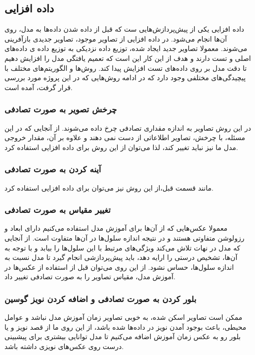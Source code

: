 \subsection{داده افزایی}\label{subsec:داده-افزایی}

داده افزایی یکی از پیش‌پردازش‌هایی ست که قبل از داده شدن داده‌ها به مدل، روی آن‌ها انجام می‌شود.
در داده افزایی از تصاویر موجود، تصاویر جدیدی بازآفرینی می‌شوند.
معمولا تصاویر جدید ایجاد شده، توزیع داده نزدیکی به توزیع داده ی داده‌های اصلی و تست دارند و هدف از این کار این است که تعمیم یافتگی مدل را افزایش دهیم تا دقت مدل بر روی داده‌های تست افزایش پیدا کند.
روش‌ها و الگوریتم‌های مختلف با پیچیدگی‌های مختلفی وجود دارد که در ادامه روش‌هایی که در این پروژه مورد بررسی قرار گرفت، آمده است.
\subsubsection{چرخش تصویر به صورت تصادفی}
در این روش تصاویر به اندازه مقداری تصادفی چرخ داده می‌شوند.
از آنجایی که در این مسئله، با چرخش، تصاویر اطلاعاتی از دست نمی دهند و علاوه بر آن، مقدار خروجی مدل ما نیز نباید تغییر کند، لذا می‌توان از این روش برای داده افزایی استفاده کرد.

\subsubsection{آینه کردن به صورت تصادفی}
مانند قسمت قبل،از این روش نیز می‌توان برای داده افزایی استفاده کرد.

\subsubsection{تغییر مقیاس به صورت تصادفی}
معمولا عکس‌هایی که از آن‌ها برای آموزش مدل استفاده می‌کنیم دارای ابعاد و رزولوشن متفاوتی هستند و در نتیجه اندازه سلول‌ها در آن‌ها متفاوت است.
از آنجایی که مدل در نهات تلاش می‌کند ویژگی‌های مرتبط با این سلول‌ها را بیابد و با توجه به آن‌ها، تشخیص درستی را ارایه دهد، باید پیش‌پردازشی انجام گیرد تا مدل نسبت به اندازه سلول‌ها، حساس نشود. از این روی می‌توان قبل از استفاده از عکس‌ها در آموزش مدل، مقیاس تصاویر را به صورت تصادفی تغییر داد.

\subsubsection{بلور کردن به صورت تصادفی و اضافه کردن نویز گوسین }
ممکن است تصاویر اسکن شده، به خوبی تصاویر زمان آموزش مدل نباشد و عوامل محیطی، باعث بوجود آمدن نویز در داده‌ها شده باشد، از این روی ما از قصد نویز و یا بلور رو به عکس زمان آموزش اضافه می‌کنیم تا مدل توانایی بیشتری برای پیشبینی درست روی عکس‌های نویزی داشته باشد.


